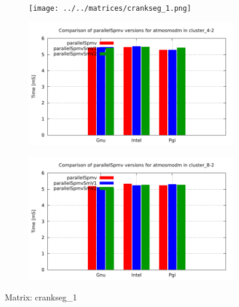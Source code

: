 \begin{figure} [ht!]
    \centering
    \captionsetup{justification=centering, singlelinecheck=false}
    \begin{subfigure}{.25\textwidth}
      \centering
      \hspace*{-1.5cm} 
      \texttt{[image: ../../matrices/crankseg\_1.png]}
      \label{fig:crankseg_1_matrix}
    \end{subfigure}%
    \begin{subfigure}{.37\textwidth}
      \centering
      \hspace*{-1.0cm} 
      \includegraphics[page=2, width=0.95\linewidth]{../plots/myCluster_4-2.pdf}
      \label{fig:crankseg_1_performance}
    \end{subfigure}
    \begin{subfigure}{.37\textwidth}
      \centering
      \hspace*{-1.0cm} 
      \includegraphics[page=2, width=0.95\linewidth]{../plots/myCluster_8-2.pdf}
      \label{fig:crankseg_1_performance}
    \end{subfigure}
\caption{Matrix: crankseg\_1}
\label{fig:crankseg_1}
\end{figure}

